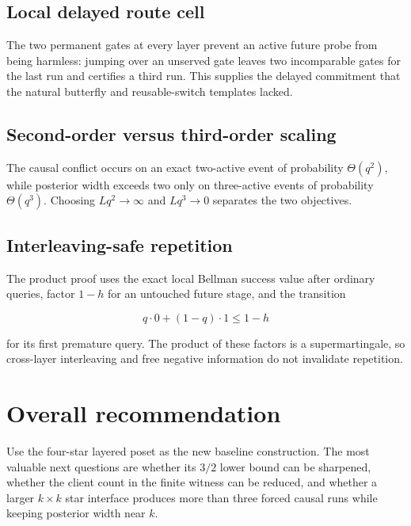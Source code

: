 \documentclass[11pt,a4paper]{article}
\begin{document}
\subsection*{Local delayed route cell}

The two permanent gates at every layer prevent an active future probe from being harmless: jumping over an unserved gate leaves two incomparable gates for the last run and certifies a third run.  This supplies the delayed commitment that the natural butterfly and reusable-switch templates lacked.


\subsection*{Second-order versus third-order scaling}

The causal conflict occurs on an exact two-active event of probability \(\Theta(q^2)\), while posterior width exceeds two only on three-active events of probability \(\Theta(q^3)\).  Choosing \(Lq^2\to\infty\) and \(Lq^3\to0\) separates the two objectives.


\subsection*{Interleaving-safe repetition}

The product proof uses the exact local Bellman success value after ordinary queries, factor \(1-h\) for an untouched future stage, and the transition


\[
 q\cdot0+(1-q)\cdot1\le1-h
\]

for its first premature query.  The product of these factors is a supermartingale, so cross-layer interleaving and free negative information do not invalidate repetition.


\section*{Overall recommendation}

Use the four-star layered poset as the new baseline construction.  The most valuable next questions are whether its \(3/2\) lower bound can be sharpened, whether the client count in the finite witness can be reduced, and whether a larger \(k\times k\) star interface produces more than three forced causal runs while keeping posterior width near \(k\).
\end{document}
